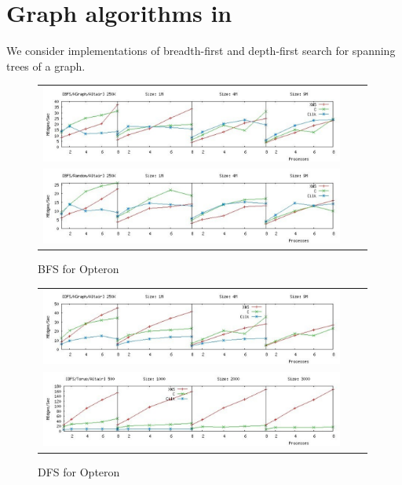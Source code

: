 \section{Graph algorithms in \XWS}\label{sec:Graph}

We consider implementations of breadth-first and depth-first search for spanning trees of a graph.

\begin{figure}
\begin{center}
 \begin{tabular}{ccc}
\includegraphics[width=10cm]{plots/bfs-kgraph-altair-color.pdf} \\
\includegraphics[width=10cm] {plots/bfs-random-altair-color.pdf} \\
\end{tabular}
\caption{BFS for Opteron}\label{altair}
\end{center}
\end{figure}

\begin{figure}
\begin{center}
 \begin{tabular}{ccc}
\includegraphics[width=10cm]{plots/dfs-kgraph-altair-color.pdf}\\
\includegraphics[width=10cm]{plots/dfs-torus-altair-color.pdf}\\
\end{tabular}
\caption{DFS for Opteron}\label{altair}
\end{center}
\end{figure}

